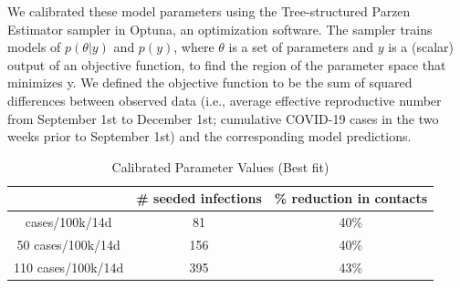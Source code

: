 \documentclass[preprint,12pt]{elsarticle}
\begin{document}
We calibrated these model parameters using the Tree-structured Parzen Estimator sampler in Optuna, an optimization software. The sampler trains models of $p(\theta|y)$ and $p(y)$, where $\theta$ is a set of parameters and $y$ is a (scalar) output of an objective function, to find the region of the parameter space that minimizes y. We defined the objective function to be the sum of squared differences between observed data (i.e., average effective reproductive number from September 1st to December 1st; cumulative COVID-19 cases in the two weeks prior to September 1st) and the corresponding model predictions. 


\begin{table}[h]
\centering
\begin{tabular}{|c|c|c|}
\hline
\textbf{} & \textbf{\# seeded infections} & \textbf{\% reduction in contacts}\\
\hline
\centering 
20 cases/100k/14d & 81 & 40\% \\
50 cases/100k/14d & 156 & 40\% \\
110 cases/100k/14d & 395 & 43\% \\
\hline
\end{tabular}
\caption{Calibrated Parameter Values (Best fit)}
\label{tab:calibration}
\end{table}
\end{document}
